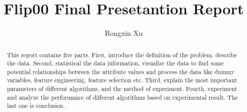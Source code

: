 \documentclass{amsart}
\begin{document}
%
%
\title[Xu's report]{Flip00 Final Presetantion Report}%

\author{Rongxin Xu}
\address[A.~1]{School of Business Administration,\\ 
Hunan University, Changsha 410012, China}%

%
%
\date{\gitAuthorDate}%

\begin{abstract}
This report contains five parts. 
First, 
introduce the definition of the problem,
describe the data. 
Second, 
statistical the data information, 
visualize the data to find some potential relationships 
between the attribute values 
and process the data 
like dummy variables, feature engineering, feature selection etc. 
Third, 
explain the most important parameters 
of different algorithms,
and the method of experiment.
Fourth,
experiment and analyze the performance of different algorithms
based on experimental result.
The last one is conclusion . 
\end{abstract}

\maketitle
\tableofcontents

\newpage



\newpage



\listoftodos
\end{document}
